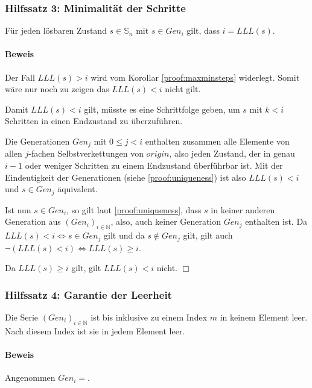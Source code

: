 \documentclass[a4paper,10pt,ngerman]{scrartcl}
\begin{document}
\subsubsection{Hilfssatz 3: Minimalität der Schritte} \label{proof:minimality}

Für jeden lösbaren Zustand \(s \in \mathbb{S}_n\) mit \(s \in Gen_i\) gilt, dass \(i = LLL(s)\).

\paragraph{Beweis}

Der Fall \(LLL(s) > i\) wird vom Korollar \cref{proof:maxminsteps} widerlegt.
Somit wäre nur noch zu zeigen das \(LLL(s) < i\) nicht gilt.

Damit \(LLL(s) < i\) gilt, müsste es eine Schrittfolge geben, um \(s\) mit \(k<i\) Schritten in einen Endzustand zu überzuführen.

Die Generationen \(Gen_j\) mit \(0 \leq j < i\) enthalten zusammen alle Elemente von allen \(j\)-fachen Selbstverkettungen von \(origin\), also jeden Zustand, der in genau \(i-1\) oder weniger Schritten zu einem Endzustand überführbar ist. Mit der Eindeutigkeit der Generationen (siehe \cref{proof:uniqueness}) ist also \(LLL(s) < i\) und \(s \in Gen_j\) äquivalent.

Ist nun \(s \in Gen_i\), so gilt laut \cref{proof:uniqueness}, dass \(s\) in keiner anderen Generation aus \((Gen_i)_{i\in\mathbb{N}}\), also, auch keiner Generation \(Gen_j\) enthalten ist. Da \(LLL(s) < i \iff s \in Gen_j\) gilt und da \(s \notin Gen_j\) gilt, gilt auch \(\lnot(LLL(s) < i) \iff LLL(s) \geq i\).

Da \(LLL(s) \geq i\) gilt, gilt \(LLL(s) < i\) nicht. \(\Box\)

\subsubsection{Hilfssatz 4: Garantie der Leerheit} \label{proof:termination}

Die Serie \((Gen_i)_{i\in\mathbb{N}}\) ist bis inklusive zu einem Index \(m\) in keinem Element leer. Nach diesem Index ist sie in jedem Element leer.

\paragraph{Beweis}

Angenommen \(Gen_i = {}\).
\end{document}
